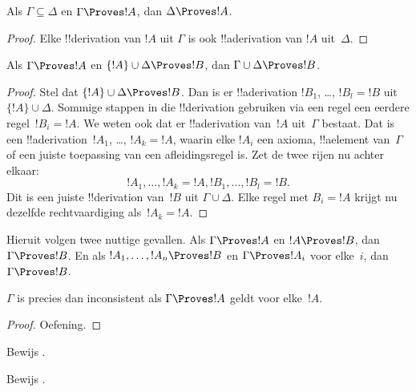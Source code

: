 \documentclass[../../../include/open-logic-section]{subfiles}
\begin{document}
\begin{prop}
Als $\Gamma \subseteq \Delta$ en $\Gamma \Proves !A$, dan $\Delta
\Proves !A$.
\end{prop}

\begin{proof}
Elke !!{derivation} van $!A$ uit $\Gamma$ is ook !!a{derivation} van
$!A$ uit~$\Delta$.
\end{proof}

\begin{prop}
Als $\Gamma \Proves !A$ en $\{!A\} \cup \Delta \Proves
!B$, dan $\Gamma \cup \Delta \Proves !B$.
\end{prop}

\begin{proof}
  Stel dat $\{!A\} \cup \Delta \Proves !B$. Dan is er
  !!a{derivation} $!B_1$, \dots, $!B_l = !B$ uit~$\{!A\} \cup
  \Delta$. Sommige stappen in die !!{derivation} gebruiken via een
  regel een eerdere regel~$!B_i = !A$. We weten ook dat er
  !!a{derivation} van~$!A$ uit~$\Gamma$ bestaat. Dat is een
  !!a{derivation}~$!A_1$, \dots, $!A_k = !A$, waarin elke $!A_i$ een
  axioma, !!a{element} van~$\Gamma$ of een juiste toepassing van een
  afleidingsregel is. Zet de twee rijen nu achter elkaar:
  \[
  !A_1, \dots, !A_k = !A, !B_1, \dots, !B_l = !B.
  \]
  Dit is een juiste !!{derivation} van~$!B$ uit $\Gamma \cup
  \Delta$. Elke regel met $B_i = !A$ krijgt nu dezelfde
  rechtvaardiging als~$!A_k = !A$.
\end{proof}

Hieruit volgen twee nuttige gevallen. Als $\Gamma \Proves !A$ en $!A
\Proves !B$, dan $\Gamma \Proves !B$. En als $!A_1,
\dots, !A_n \Proves !B$ en $\Gamma \Proves !A_i$ voor elke~$i$, dan
$\Gamma \Proves !B$.

\begin{prop}
$\Gamma$ is precies dan inconsistent als $\Gamma \Proves !A$ geldt
voor elke~$!A$.
\end{prop}

\begin{proof}
Oefening.
\end{proof}

\begin{prob}
Bewijs .
\end{prob}
\tagendprob

\begin{prob}
Bewijs .
\end{prob}
\tagendprob
\end{document}
